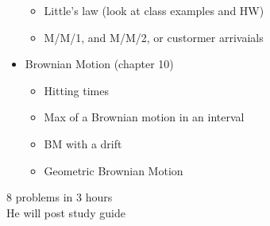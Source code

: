\documentclass[answers,12pt,addpoints]{exam}
\begin{document}
\begin{itemize}
    \begin{itemize}
        \item Little's law (look at class examples and HW)
        \item M/M/1, and M/M/2, or custormer arrivaials 
    \end{itemize}
    \item Brownian Motion (chapter 10)
    \begin{itemize}
        \item Hitting times
        \item Max of a Brownian motion in an interval
        \item BM with a drift
        \item Geometric Brownian Motion
    \end{itemize}
\end{itemize}
8 problems in 3 hours\\
He will post study guide\\
\newpage
\end{document}
